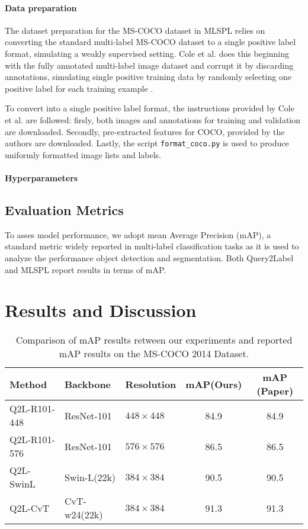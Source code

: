 \documentclass[lettersize,journal]{IEEEtran}
\begin{document}
\paragraph{Data preparation}
The dataset preparation for the MS-COCO dataset in MLSPL relies on converting the standard multi-label MS-COCO dataset to a single positive label format, simulating a weakly supervised setting. Cole et al. does this beginning with the fully annotated multi-label image dataset and corrupt it by discarding annotations, simulating single positive training data by randomly selecting one positive label for each training example \cite{mlsp}.

\vspace{1em}

To convert into a single positive label format, the instructions provided by Cole et al. are followed: firsly, both images and annotations for training and validation are downloaded. Secondly, pre-extracted features for COCO, provided by the authors are downloaded. Lastly, the script \texttt{format\_coco.py} is used to produce uniformly formatted image lists and labels.

\vspace{1em}

\paragraph{Hyperparameters}

\subsection{Evaluation Metrics}
To asses model performance, we adopt mean Average Precision (mAP), a standard metric widely reported in multi-label classification tasks as it is used to analyze the performance object detection and segmentation. Both Query2Label and MLSPL report results in terms of mAP. 


\section{Results and Discussion}
\begin{table*}[!t]
    \small
    \caption{Comparison of mAP results retween our experiments and reported mAP results on the MS-COCO 2014 Dataset.}
    \label{tab:q2l_map_comparison}
    \centering
    \begin{tabular}{l l l c c}
    \toprule
    \textbf{Method} & \textbf{Backbone} & \textbf{Resolution} & \textbf{mAP(Ours)} & \textbf{mAP (Paper)} \\
    \midrule
    Q2L-R101-448 & ResNet-101     & $448\times448$ & 84.9 & 84.9 \\
    Q2L-R101-576 & ResNet-101     & $576\times576$ & 86.5 & 86.5 \\
    Q2L-SwinL    & Swin-L(22k)    & $384\times384$ & 90.5 & 90.5 \\
    Q2L-CvT      & CvT-w24(22k)   & $384\times384$ & 91.3 & 91.3 \\
    \bottomrule
    \end{tabular}
\end{table*}
\end{document}
